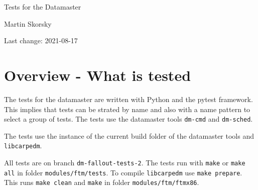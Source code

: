 \documentclass[12pt,a4paper]{report}
\begin{document}
\begin{titlepage}
\vspace{2cm}
\begin{center}
\Huge{Tests for the Datamaster}

\Large{Martin Skorsky}

\Large{Last change: 2021-08-17}
\end{center}
\vfill
\end{titlepage}

\tableofcontents

\chapter{Overview - What is tested}
The tests for the datamaster are written with Python and the pytest framework. This implies that tests can be strated
by name and also with a name pattern to select a group of tests. The tests use the datamaster tools \texttt{dm-cmd}
and \texttt{dm-sched}.

The tests use the instance of the current build folder of the datamaster tools and \texttt{libcarpedm}.

All tests are on branch \texttt{dm-fallout-tests-2}. The tests run with \texttt{make} or \texttt{make all} in folder \texttt{modules/ftm/tests}.
To compile \texttt{libcarpedm} use \texttt{make prepare}. This runs \texttt{make clean} and \texttt{make} in folder \texttt{modules/ftm/ftmx86}.
\end{document}
